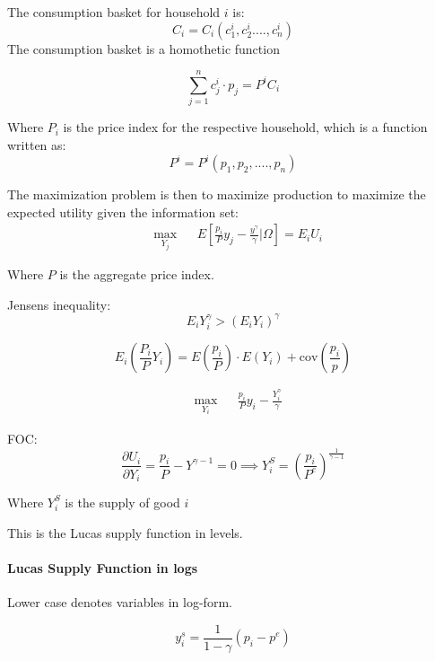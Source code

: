 The consumption basket for household $i$ is:
\begin{equation}
    C_i = C_i \left( c_1^{i}, c_2^{i} ...., c_n^{i}  \right)
\end{equation}
The consumption basket is a homothetic function 


$$
\sum_{j = 1 }^{n} c_j^{i} \cdot p_j = P^{i} C_i
$$

Where $P_i$ is  the price index for the respective household, which is a function written as: 
$$
P^{i} = P^{i} (p_1, p_2, ...., p_n)
$$

The maximization problem is then to maximize production to maximize the expected utility given the information set:
\begin{equation*}
\begin{aligned}
& \underset{Y_j}{\max}
& & E \left[ \frac{p_i}{P} y_j - \frac{y^{\gamma}}{\gamma} \bigg\rvert \Omega \right] = E_i U_i
\end{aligned}
\end{equation*}

Where $P$ is the aggregate price index. 

Jensens inequality: 
$$
E_iY_i^\gamma > (E_iY_i)^\gamma
$$


$$
E_i \left( \frac{P_i}{P} Y_i  \right) = E \left( \frac{p_i}{P}  \right) \cdot E(Y_i) + \text{cov}\left( \frac{p_i}{p} \right)
$$

\begin{equation*}
\begin{aligned}
& \underset{Y_i}{\max}
& & \frac{p_i}{P} y_i - \frac{Y_i^{\gamma}}{\gamma}
\end{aligned}
\end{equation*}

FOC:
$$
\frac{\partial U_i}{\partial Y_i} = \frac{p_i}{P} - Y^{\gamma - 1} = 0 \implies Y^S_i = \left( \frac{p_i}{P^e} \right)^\frac{1}{\gamma - 1 }
$$

Where $Y_i^S$ is the supply of good $i$

This is the Lucas supply function in levels.



\paragraph{Lucas Supply Function in logs}

Lower case denotes variables in log-form.

$$y _ { i } ^ { s } =  \frac{1}{ 1 - \gamma} \left( p _ { i } - p ^ { e }  \right)     $$

